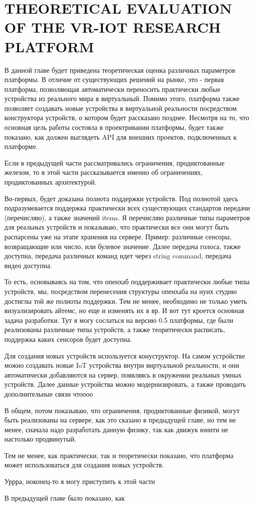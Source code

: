 
\chapter{THEORETICAL EVALUATION OF THE VR-IOT RESEARCH PLATFORM}
В данной главе будет приведена теоретическая оценка различных параметров платформы. В отличие от существующих решений на рынке, это - первая платформа, позволяющая автоматически переносить практически любые устройства из реального мира в виртуальный. Помимо этого, платформа также позволяет создавать новые устройства в виртуальной реальности посредством конструктора устройств, о котором будет рассказано позднее. Несмотря на то, что основная цель работы состояла в проектривании платформы, будет также показано, как должен выглядеть API для внешних проектов, подключенных к платформе.

Если в предыдущей части рассматривались ограничения, продиктованные железом, то в этой части рассказывается именно об ограничениях, продиктованных архитектурой.

Во-первых, будет доказана полнота поддержки устройств. Под полнотой здесь подразумевается поддержка практически всех существующих стандартов передачи (перечисляю), а также значений items. Я перечисляю различные типы параметров для реальных устройств и показываю, что практически все они могут быть распарсены уже на этапе хранения на сервере. Пример: различные сенсоры, возвращающие или число, или булевое значение. Далее передача голоса, также доступна, передача различных команд идет через string command, передача видео доступна.

То есть, основываясь на том, что опенхаб поддерживает практически любые типы устройств, мы, посредством перенесения структуры опенхаба на нуих студию достиглы той же полноты поддержки. Тем не менее, необходимо не только уметь визуализировать айтемс, но еще и изменять их в вр. И вот тут кроется основная задача разработки. Тут я могу сослаться на версию 0.5 платформы, где были реализованы различные типы устройств, а также теоритически расписать, поддержка каких сенсоров будет доступна.

Для создания новых устройств используется конуструктор. На самом устройстве можно создавать новые IoT устройства внутри виртуальной реальности, и они автоматически добавляются на сервер, появляясь в окружении реальных умных устройств. Далее данные устройства можно модернизировать, а также проводить дополнительные связи чтоооо

В общем, потом показываю, что ограничения, продиктованные физикой, могут быть реализованы на сервере, как это сказано в предыдущей главе, но тем не менее, сначала надо разработать данную физику, так как движук юнити не настолько продвинутый.

Тем не менее, как практически, так и теоретически показано, что платформа может использоваться для создания новых устройств.



Уррра, ноконец-то я могу приступить к этой части


В предыдущей главе было показано, как 
